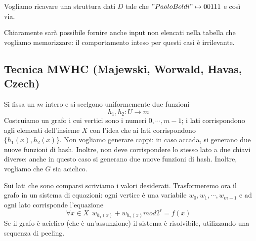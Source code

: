 Vogliamo ricavare una struttura dati $D$ tale che $"Paolo Boldi" \mapsto 00111$ e così via.


Chiaramente sarà possibile fornire anche input non elencati nella tabella che vogliamo memorizzare:
il comportamento inteso per questi casi è irrilevante.
\subsection{Tecnica MWHC (Majewski, Worwald, Havas, Czech)}
Si fissa un $m$ intero e si scelgono uniformemente due funzioni
$$
	h_1, h_2 : U \rightarrow m
$$
Costruiamo un grafo i cui vertici sono i numeri $0, \cdots, m-1$; i lati corrispondono agli elementi
dell'insieme $X$ con l'idea che ai lati corrispondono $\{h_1(x), h_2(x)\}$. Non vogliamo generare
cappi: in caso accada, si generano due nuove funzioni di hash. Inoltre, non deve corrispondere lo
stesso lato a due chiavi diverse: anche in questo caso si generano due nuove funzioni di hash.
Inoltre, vogliamo che $G$ sia aciclico.

Sui lati che sono comparsi scriviamo i valori desiderati. Trasformeremo ora il grafo in un sistema di
equazioni: ogni vertice è una variabile $w_0, w_1, \cdots, w_{m-1}$ e ad ogni lato corrisponde
l'equazione
$$
	\forall x \in X ~~ w_{h_1(x)} + w_{h_2(x)} mod 2^r = f(x)
$$
Se il grafo è aciclico (che è un'assunzione) il sistema è risolvibile, utilizzando una sequenza di
peeling.
